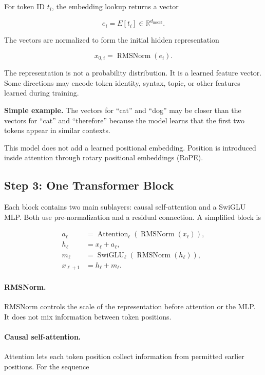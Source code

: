 \documentclass[11pt,a4paper]{article}
\begin{document}
For token ID $t_i$, the embedding lookup returns a vector

\begin{equation}
  e_i=E[t_i]\in\mathbb{R}^{d_{\mathrm{model}}}.
\end{equation}

The vectors are normalized to form the initial hidden representation

\begin{equation}
  x_{0,i}=\operatorname{RMSNorm}(e_i).
\end{equation}

The representation is not a probability distribution. It is a learned feature
vector. Some directions may encode token identity, syntax, topic, or other
features learned during training.

\textbf{Simple example.} The vectors for ``cat'' and ``dog'' may be closer than
the vectors for ``cat'' and ``therefore'' because the model learns that the
first two tokens appear in similar contexts.

This model does not add a learned positional embedding. Position is introduced
inside attention through rotary positional embeddings (RoPE).

\subsection{Step 3: One Transformer Block}

Each block contains two main sublayers: causal self-attention and a SwiGLU MLP.
Both use pre-normalization and a residual connection. A simplified block is

\begin{align}
  a_\ell &= \operatorname{Attention}_\ell
    (\operatorname{RMSNorm}(x_\ell)),\\
  h_\ell &= x_\ell+a_\ell,\\
  m_\ell &= \operatorname{SwiGLU}_\ell
    (\operatorname{RMSNorm}(h_\ell)),\\
  x_{\ell+1} &= h_\ell+m_\ell.
\end{align}

\paragraph{RMSNorm.}
RMSNorm controls the scale of the representation before attention or the MLP.
It does not mix information between token positions.

\paragraph{Causal self-attention.}
Attention lets each token position collect information from permitted earlier
positions. For the sequence
\end{document}
